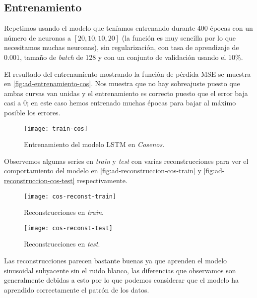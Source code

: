 \subsection{Entrenamiento}

Repetimos usando el modelo que teníamos entrenando durante 400 épocas con un número de neuronas a $[20, 10, 10, 20]$ (la función es muy sencilla por lo que necesitamos muchas neuronas), sin regularización, con tasa de aprendizaje de $0.001$, tamaño de \emph{batch} de 128 y con un conjunto de validación usando el 10\%.

El resultado del entrenamiento mostrando la función de pérdida MSE se muestra en \autoref{fig:ad-entrenamiento-cos}. Nos muestra que no hay sobreajuste puesto que ambas curvas van unidas y el entrenamiento es correcto puesto que el error baja casi a 0; en este caso hemos entrenado muchas épocas para bajar al máximo posible los errores.

\begin{figure}[htpb]
  \centering
  \texttt{[image: train-cos]}
  \caption{Entrenamiento del modelo LSTM en \emph{Cosenos}.}
  \label{fig:ad-entrenamiento-cos}
\end{figure}

Observemos algunas series en \emph{train} y \emph{test} con varias reconstrucciones para ver el comportamiento del modelo en \autoref{fig:ad-reconstruccion-cos-train} y \autoref{fig:ad-reconstruccion-cos-test} respectivamente.

\begin{figure}[htpb]
  \centering
  \texttt{[image: cos-reconst-train]}
  \caption{Reconstrucciones en \emph{train}.}
  \label{fig:ad-reconstruccion-cos-train}
\end{figure}

\begin{figure}[htpb]
  \centering
  \texttt{[image: cos-reconst-test]}
  \caption{Reconstrucciones en \emph{test}.}
  \label{fig:ad-reconstruccion-cos-test}
\end{figure}

Las reconstrucciones parecen bastante buenas ya que aprenden el modelo sinusoidal subyacente sin el ruido blanco, las diferencias que observamos son generalmente debidas a esto por lo que podemos considerar que el modelo ha aprendido correctamente el patrón de los datos.

